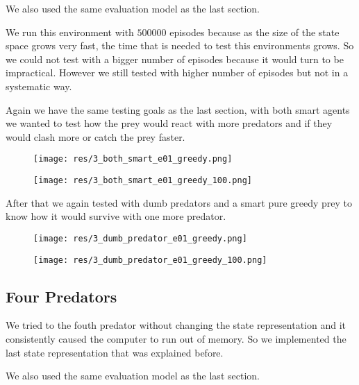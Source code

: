 \documentclass{article}
\begin{document}
We also used the same evaluation model as the last section.

We run this environment with $500000$ episodes because as the size of the state
space grows very fast, the time that is needed to test this environments grows.
So we could not test with a bigger number of episodes because it would turn to
be impractical. However we still tested with higher number of episodes but not
in a systematic way.

Again we have the same testing goals as the last section, with both smart agents
we wanted to test how the prey would react with more predators and if they would
clash more or catch the prey faster.
\begin{figure}[htbp]
	\centering
	\begin{minipage}[t]{.45\linewidth}
		\centering
		\texttt{[image: res/3\_both\_smart\_e01\_greedy.png]}
	\end{minipage}
	\begin{minipage}[t]{.45\linewidth}
		\centering
		\texttt{[image: res/3\_both\_smart\_e01\_greedy\_100.png]}
	\end{minipage}
\end{figure}

After that we again tested with dumb predators and a smart pure greedy prey to
know how it would survive with one more predator.
\begin{figure}[htbp]
	\centering
	\begin{minipage}[t]{.45\linewidth}
		\centering
		\texttt{[image: res/3\_dumb\_predator\_e01\_greedy.png]}
	\end{minipage}
	\begin{minipage}[t]{.45\linewidth}
		\centering
		\texttt{[image: res/3\_dumb\_predator\_e01\_greedy\_100.png]}
	\end{minipage}
\end{figure}

\subsection{Four Predators}
We tried to the fouth predator without changing the state representation and
it consistently caused the computer to run out of memory. So we implemented
the last state representation that was explained before. 

We also used the same evaluation model as the last section.
\end{document}
